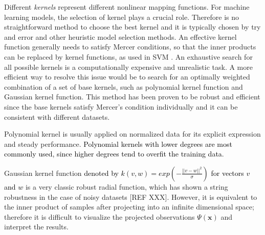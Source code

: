 Different \textit{kernels} represent different nonlinear mapping functions. For machine learning models, the selection of kernel plays a crucial role. Therefore is no straightforward method to choose the best kernel and it is typically chosen by try and error and other heuristic model selection methods. An effective kernel function generally needs to satisfy Mercer conditions, so that the inner products can be replaced by kernel functions, as used in SVM \cite{cristianini2000introduction}. 
An exhaustive search for all possible kernels is a computationally expensive and unrealistic task\cite{chapelle1999support}. A more efficient way to resolve this issue would be to search for an optimally weighted combination of a set of base kernels, such as polynomial kernel function and Gaussian kernel function\cite{lanckriet2002robust}. This method has been proven to be robust and efficient since the base kernels satisfy Mercer’s condition individually and it can be consistent with different datasets\cite{jebara2004multi}.


Polynomial kernel is usually applied on normalized data for its explicit expression and steady performance. \textcolor{black}{Polynomial kernels with lower degrees are most commonly used, since higher degrees tend to overfit the training data\cite{chang2010training}}.%

Gaussian kernel function \textcolor{black}{denoted by $k(v,w)=exp(-\frac{||v-w||^2}{\sigma})$ for vectors $v$ and $w$} is a very classic robust radial function, which has shown a string robustness in the case of noisy datasets [REF XXX]. However, it is equivalent to the inner product of samples after projecting into an infinite dimensional space; therefore it is difficult to visualize the projected observations $\Psi(\mathbf{x})$ and interpret the results. %

